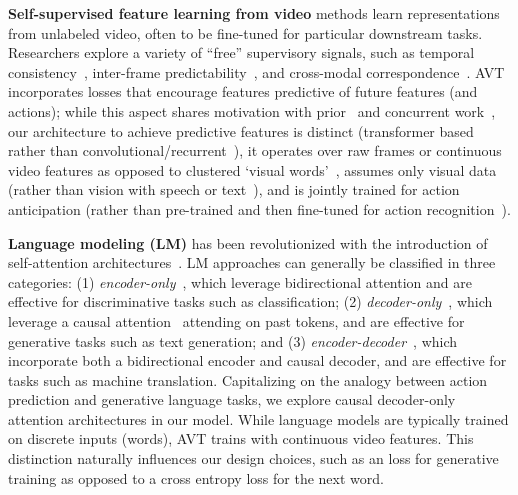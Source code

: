 \documentclass[10pt,twocolumn,letterpaper]{article}
\newcommand{\method}{AVT\xspace}
\begin{document}
{\noindent \bf Self-supervised feature learning from video} methods learn representations from unlabeled video, often to be fine-tuned for particular downstream tasks.  Researchers explore a variety of ``free'' supervisory signals, such as temporal consistency~\cite{jayaraman2016slow,fernando2017self,wei2018learning,kim2019self,yang2020vthcl}, inter-frame predictability~\cite{jayaraman2015learning,han2019dpc,sun2019contrastive,han2020memdpc}, and cross-modal correspondence~\cite{look-listen-2017,korbar2018cooperative,sun2019contrastive,sun2019videobert}.
\method incorporates losses that encourage features predictive of future features (and actions); while this aspect shares motivation with prior~\cite{vondrick2016anticipating,han2019dpc,han2020memdpc,sun2019contrastive,sun2019videobert,rodriguez2018action,liu2018future,luc2018predicting,shi2018action,gammulle2019predicting} and concurrent work~\cite{wu2021imaginernn}, our architecture to achieve predictive features is distinct (transformer based rather than convolutional/recurrent~\cite{han2019dpc,han2020memdpc,wu2021imaginernn,shi2018action,gammulle2019predicting}), it operates over raw frames or continuous video features as opposed to clustered `visual words'~\cite{sun2019videobert}, assumes only visual data (rather than vision with speech or text~\cite{sun2019contrastive,sun2019videobert}), and is jointly trained for action anticipation (rather than pre-trained and then fine-tuned for action recognition~\cite{han2019dpc,han2020memdpc,sun2019contrastive}).













{\noindent \bf Language modeling (LM)} has been revolutionized with the introduction of self-attention architectures~\cite{vaswani2017attention}. LM approaches can generally be classified in three categories: (1) {\em encoder-only}~\cite{devlin2019bert,peters2018deep}, which leverage bidirectional attention and are effective for discriminative tasks such as classification; (2) {\em decoder-only}~\cite{brown2020language,radford2018improving}, which leverage a causal attention~\cite{lample2019cross} attending on past tokens, and are effective for generative tasks such as text generation; and (3) {\em encoder-decoder}~\cite{raffel2020exploring,lewis2020bart}, which incorporate both a bidirectional encoder and causal decoder, and are effective for tasks such as machine translation. Capitalizing on the
analogy between
action prediction and generative language tasks, we explore causal decoder-only attention architectures in our model.  While language models are typically trained on discrete inputs (words), \method trains with continuous video features.  This distinction naturally influences our design choices, such as an  loss for generative training as opposed to a cross entropy loss for the next word.
\end{document}
